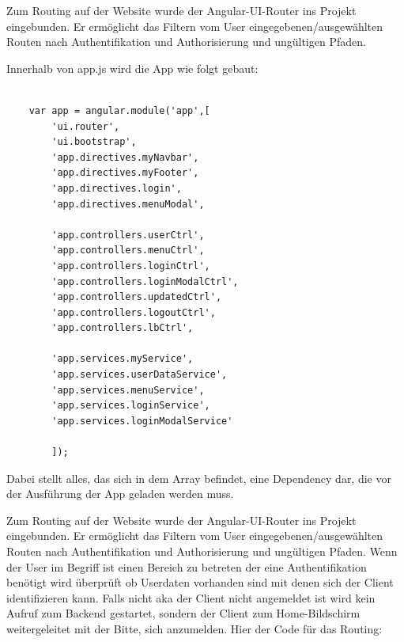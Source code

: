 \documentclass[11pt,a4paper]{article} %
\begin{document}
Zum Routing auf der Website wurde der Angular-UI-Router ins Projekt eingebunden. Er ermöglicht das Filtern vom User eingegebenen/ausgewählten Routen nach Authentifikation und Authorisierung und ungültigen Pfaden. 

Innerhalb von app.js wird die App wie folgt gebaut:

\begin{frame}

\begin{lstlisting}
	
	var app = angular.module('app',[
		'ui.router',
		'ui.bootstrap',
		'app.directives.myNavbar',
		'app.directives.myFooter',
		'app.directives.login',
		'app.directives.menuModal',

		'app.controllers.userCtrl',
		'app.controllers.menuCtrl',
		'app.controllers.loginCtrl',
		'app.controllers.loginModalCtrl',
		'app.controllers.updatedCtrl',
		'app.controllers.logoutCtrl',
		'app.controllers.lbCtrl',

		'app.services.myService',
		'app.services.userDataService',
		'app.services.menuService',
		'app.services.loginService',
		'app.services.loginModalService'

		]);
\end{lstlisting}
\end{frame}

Dabei stellt alles, das sich in dem Array befindet, eine Dependency dar, die vor der Ausführung der App geladen werden muss.

Zum Routing auf der Website wurde der Angular-UI-Router ins Projekt eingebunden. Er ermöglicht das Filtern vom User eingegebenen/ausgewählten Routen nach Authentifikation und Authorisierung und ungültigen Pfaden. 
Wenn der User im Begriff ist einen Bereich zu betreten der eine Authentifikation benötigt wird überprüft ob Userdaten vorhanden sind mit denen sich der Client identifizieren kann. Falls nicht aka der Client nicht angemeldet ist wird kein Aufruf zum Backend gestartet, sondern der Client zum Home-Bildschirm weitergeleitet mit der Bitte, sich anzumelden.
Hier der Code für das Routing:
\end{document}
